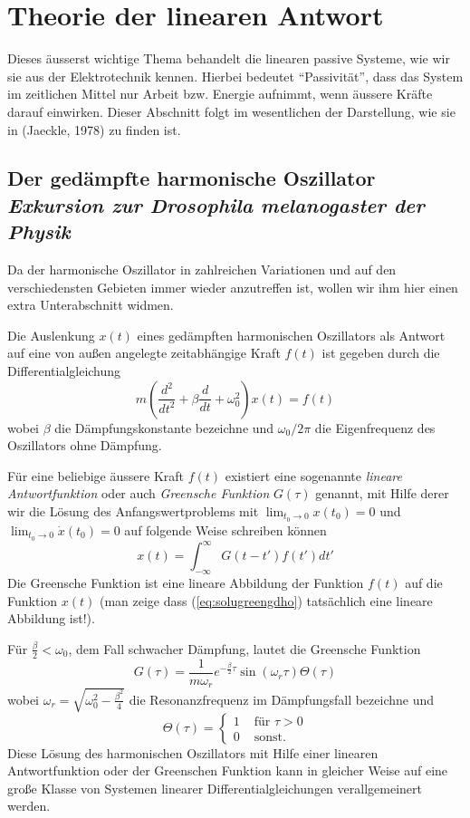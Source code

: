 \chapter{Theorie der linearen Antwort}
Dieses äusserst wichtige Thema behandelt die linearen passive Systeme, wie wir
sie aus der Elektrotechnik kennen. Hierbei bedeutet ``Passivität'', dass das
System im zeitlichen Mittel nur Arbeit bzw. Energie aufnimmt, wenn äussere
Kräfte darauf einwirken. Dieser Abschnitt folgt im wesentlichen der
Darstellung, wie sie in (Jaeckle, 1978) zu finden ist.
\section{Der gedämpfte harmonische Oszillator
\it Exkursion zur Drosophila melanogaster der Physik}\label{sec:gho}
Da der harmonische Oszillator in zahlreichen Variationen und auf den
verschiedensten Gebieten immer wieder anzutreffen ist, wollen wir ihm hier
einen extra Unterabschnitt widmen. 

Die Auslenkung $x(t)$ eines gedämpften harmonischen Oszillators als Antwort
auf eine von außen angelegte zeitabhängige Kraft $f(t)$ ist gegeben durch
die Differentialgleichung
\begin{equation}
  m\left(\frac{d^2}{dt^2}+\beta\frac{d}{dt}+\omega_0^2\right)x(t)=f(t)  
  \label{eq:gdho}
\end{equation}
wobei $\beta$ die Dämpfungskonstante bezeichne und $\omega_0/2\pi$ die
Eigenfrequenz des Oszillators ohne Dämpfung.

Für eine beliebige äussere Kraft $f(t)$ existiert eine sogenannte {\it
lineare Antwortfunktion} oder auch {\it Greensche Funktion} $G(\tau)$ genannt,
mit Hilfe derer wir die Lösung des Anfangswertproblems mit
$\lim_{t_0\rightarrow 0}x(t_0)=0$ und $\lim_{t_0\rightarrow 0}\dot{x}(t_0)=0$
auf folgende Weise schreiben können
\begin{equation}
  x(t)=\int_{-\infty}^{\infty}G(t-t')f(t')dt'
  \label{eq:solugreengdho}
\end{equation}
Die Greensche Funktion ist eine lineare Abbildung der Funktion $f(t)$ auf die
Funktion $x(t)$ (man zeige dass (\ref{eq:solugreengdho}) tatsächlich eine
lineare Abbildung ist!).

Für $\frac{\beta}{2}<\omega_0$, dem Fall schwacher Dämpfung, lautet die
Greensche Funktion 
\begin{equation}
  G(\tau)=\frac{1}{m\omega_r}e^{-\frac{\beta}{2}\tau}\sin(\omega_r\tau)\Theta(\tau)
  \label{eq:Greenfunction}
\end{equation}
wobei $\omega_r=\sqrt{\omega_0^2-\frac{\beta^2}{4}}$ die Resonanzfrequenz im
Dämpfungsfall bezeichne und 
\begin{equation*}
  \Theta(\tau)=\left\{\begin{array}{cc}1&\mbox{ für }\tau>0\\0&\mbox{ sonst. }\end{array}\right.
\end{equation*}
Diese Lösung des harmonischen Oszillators mit Hilfe einer linearen
Antwortfunktion oder der Greenschen Funktion kann in gleicher Weise auf eine
gro{\ss}e Klasse von Systemen linearer Differentialgleichungen verallgemeinert
werden.

